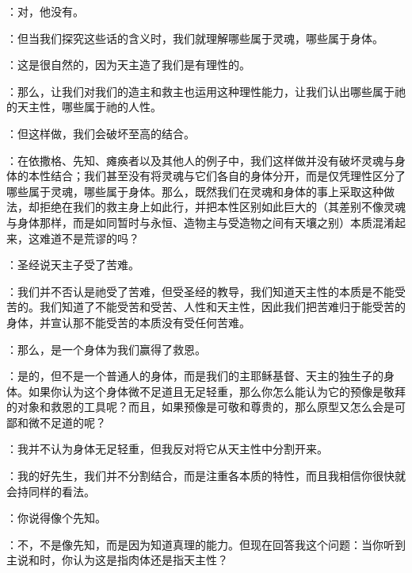 ：对，他没有。\par

：但当我们探究这些话的含义时，我们就理解哪些属于灵魂，哪些属于身体。\par

：这是很自然的，因为天主造了我们是有理性的。\par

：那么，让我们对我们的造主和救主也运用这种理性能力，让我们认出哪些属于祂的天主性，哪些属于祂的人性。\par

：但这样做，我们会破坏至高的结合。\par

：在依撒格、先知、瘫痪者以及其他人的例子中，我们这样做并没有破坏灵魂与身体的本性结合；我们甚至没有将灵魂与它们各自的身体分开，而是仅凭理性区分了哪些属于灵魂，哪些属于身体。那么，既然我们在灵魂和身体的事上采取这种做法，却拒绝在我们的救主身上如此行，并把本性区别如此巨大的（其差别不像灵魂与身体那样，而是如同暂时与永恒、造物主与受造物之间有天壤之别）本质混淆起来，这难道不是荒谬的吗？\par

：圣经说天主子受了苦难。\par

：我们并不否认是祂受了苦难，但受圣经的教导，我们知道天主性的本质是不能受苦的。我们知道了不能受苦和受苦、人性和天主性，因此我们把苦难归于能受苦的身体，并宣认那不能受苦的本质没有受任何苦难。\par

：那么，是一个身体为我们赢得了救恩。\par

：是的，但不是一个普通人的身体，而是我们的主耶稣基督、天主的独生子的身体。如果你认为这个身体微不足道且无足轻重，那么你怎么能认为它的预像是敬拜的对象和救恩的工具呢？而且，如果预像是可敬和尊贵的，那么原型又怎么会是可鄙和微不足道的呢？\par

：我并不认为身体无足轻重，但我反对将它从天主性中分割开来。\par

：我的好先生，我们并不分割结合，而是注重各本质的特性，而且我相信你很快就会持同样的看法。\par

：你说得像个先知。\par

：不，不是像先知，而是因为知道真理的能力。但现在回答我这个问题：当你听到主说和时，你认为这是指肉体还是指天主性？\par

